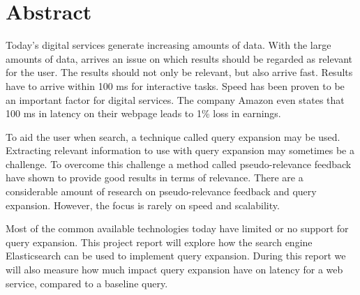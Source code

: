 \chapter*{Abstract}
Today's digital services generate increasing amounts of data.
With the large amounts of data, arrives an issue on which results should be regarded as relevant for the user.
The results should not only be relevant, but also arrive fast.
Results have to arrive within 100 ms for interactive tasks.
Speed has been proven to be an important factor for digital services.
The company Amazon even states that 100 ms in latency on their webpage leads to 1\% loss in earnings.

To aid the user when search, a technique called query expansion may be used.
Extracting relevant information to use with query expansion may sometimes be a challenge.
To overcome this challenge a method called pseudo-relevance feedback have shown to provide good results in terms of relevance.
There are a considerable amount of research on pseudo-relevance feedback and query expansion.
However, the focus is rarely on speed and scalability.

Most of the common available technologies today have limited or no support for query expansion.
This project report will explore how the search engine Elasticsearch can be used to implement query expansion.
During this report we will also measure how much impact query expansion have on latency for a web service,
compared to a baseline query.
